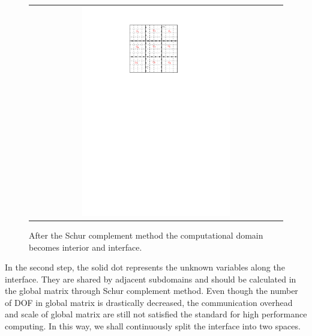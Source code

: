 \begin{figure}[h]
	\centering
	\begin{tabular}{c}
		\includegraphics[width=0.6\textwidth]{./pics/domain2.pdf}
	\end{tabular}
	\caption{\footnotesize After the Schur complement method the computational domain becomes interior and interface.}\label{fig4: domain1}
\end{figure}

In the second step, the solid dot represents the unknown variables along the interface. They are shared by adjacent subdomains and should be calculated in the global matrix through Schur complement method. Even though the number of DOF in global matrix is drastically decreased, the communication overhead and scale of global matrix are still not satisfied the standard for high performance computing. In this way, we shall continuously split the interface into two spaces.


